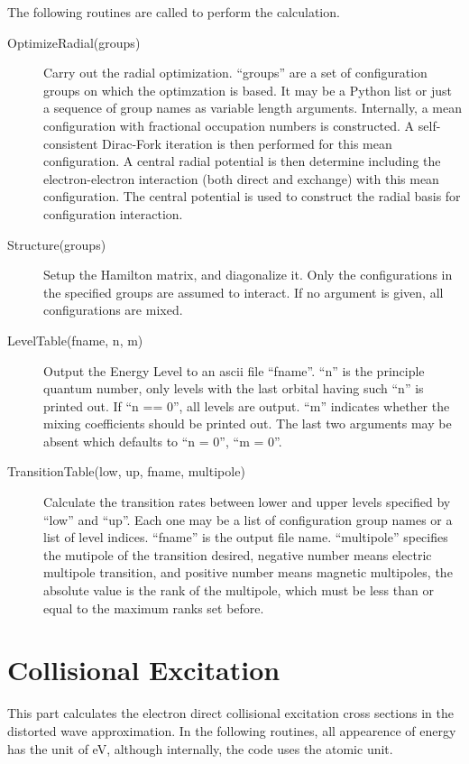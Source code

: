 \documentclass[12pt]{article}
\begin{document}
The following routines are called to perform the calculation.
\begin{description}
\item[OptimizeRadial(groups)] 
Carry out the radial optimization. ``groups'' are a set of configuration
groups on which the optimzation is based. It may be a Python list or just a
sequence of group names as variable length arguments. Internally, a mean
configuration with fractional 
occupation numbers is constructed. A self-consistent Dirac-Fork iteration
is then performed for this mean configuration. A central radial potential is
then determine including the electron-electron interaction (both direct and
exchange) with this mean configuration. The central potential is used to
construct the radial basis for configuration interaction. 

\item[Structure(groups)] 
Setup the Hamilton matrix, and diagonalize
it. Only the configurations in the specified groups are assumed to
interact. If no argument is given, all configurations are mixed. 

\item[LevelTable(fname, n, m)] 
Output the Energy Level to an ascii file ``fname''. ``n'' is the principle
quantum number, only levels with the last orbital having such ``n'' is printed
out. If ``n == 0'', all levels are output. ``m'' indicates whether the mixing
coefficients should be printed out. The last two arguments may be absent which
defaults to ``n = 0'', ``m = 0''.

\item[TransitionTable(low, up, fname, multipole)] 
Calculate the transition rates between lower and upper levels specified by
``low'' and ``up''. Each one may be a list of configuration group names or a
list of level indices. ``fname'' is the output file name. ``multipole''
specifies the mutipole of the transition desired, negative number means
electric multipole transition, and positive number means magnetic multipoles,
the absolute value is the rank of the multipole, which must be less than or
equal to the maximum ranks set before. 
\end{description}


\section{Collisional Excitation}
This part calculates the electron direct collisional excitation cross
sections in the distorted wave approximation. In the following routines, all
appearence of energy has the unit of eV, although internally, the code uses
the atomic unit.
\end{document}
